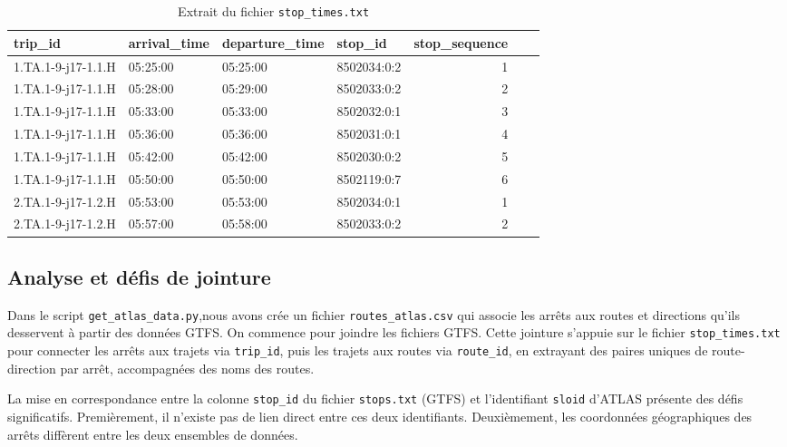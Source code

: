 \begin{itemize}
    \begin{table}[h]
    \caption{Extrait du fichier \texttt{stop\_times.txt}}
    \label{tab:stop_times}
    \centering
    \begin{tabular}{l l l l r l l}
    \toprule
    trip\_id & arrival\_time & departure\_time & stop\_id & stop\_sequence \\
    \midrule
    1.TA.1-9-j17-1.1.H & 05:25:00 & 05:25:00 & 8502034:0:2 & 1 \\
    1.TA.1-9-j17-1.1.H & 05:28:00 & 05:29:00 & 8502033:0:2 & 2 \\
    1.TA.1-9-j17-1.1.H & 05:33:00 & 05:33:00 & 8502032:0:1 & 3 \\
    1.TA.1-9-j17-1.1.H & 05:36:00 & 05:36:00 & 8502031:0:1 & 4 \\
    1.TA.1-9-j17-1.1.H & 05:42:00 & 05:42:00 & 8502030:0:2 & 5 \\
    1.TA.1-9-j17-1.1.H & 05:50:00 & 05:50:00 & 8502119:0:7 & 6 \\
    2.TA.1-9-j17-1.2.H & 05:53:00 & 05:53:00 & 8502034:0:1 & 1 \\
    2.TA.1-9-j17-1.2.H & 05:57:00 & 05:58:00 & 8502033:0:2 & 2 \\
    \bottomrule
    \end{tabular}
    \end{table}
\end{itemize}


\subsection{Analyse et défis de jointure}

Dans le script \texttt{get\_atlas\_data.py},nous avons crée un fichier \texttt{routes\_atlas.csv} qui associe les arrêts aux routes et directions qu’ils desservent à partir des données GTFS. On commence pour joindre les fichiers GTFS. Cette jointure s’appuie sur le fichier \texttt{stop\_times.txt} pour connecter les arrêts aux trajets via \texttt{trip\_id}, puis les trajets aux routes via \texttt{route\_id}, en extrayant des paires uniques de route-direction par arrêt, accompagnées des noms des routes.

La mise en correspondance entre la colonne \texttt{stop\_id} du fichier \texttt{stops.txt} (GTFS) et l’identifiant \texttt{sloid} d’ATLAS présente des défis significatifs. Premièrement, il n’existe pas de lien direct entre ces deux identifiants. Deuxièmement, les coordonnées géographiques des arrêts diffèrent entre les deux ensembles de données.

